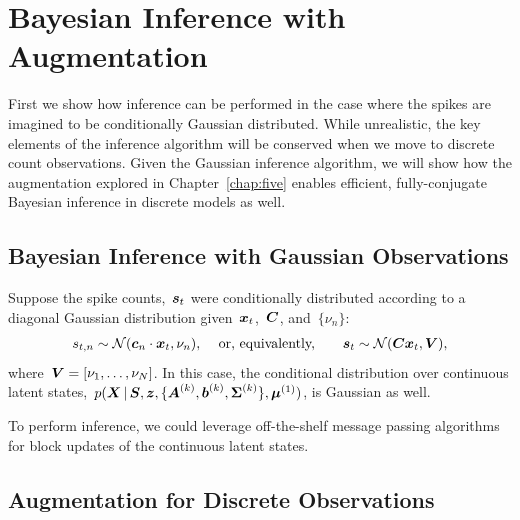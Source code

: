 \section{Bayesian Inference with \polyagamma Augmentation}

First we show how inference can be performed in the case where
the spikes are imagined to be conditionally Gaussian distributed.
While unrealistic, the key elements of the inference algorithm
will be conserved when we move to discrete count observations.
Given the Gaussian inference algorithm, we will show how the \polyagamma
augmentation explored in Chapter~\ref{chap:five} enables efficient,
fully-conjugate Bayesian inference in discrete models as well.


\subsection{Bayesian Inference with Gaussian Observations}
Suppose the spike counts,~$\boldsymbol{s}_t$ were conditionally distributed
according to a diagonal Gaussian distribution given~$\boldsymbol{x}_t$,~$\boldsymbol{C}$,
and~$\{\nu_n\}$:
\begin{align*}
  s_{t,n} \sim \mathcal{N}(\boldsymbol{c}_n \cdot \boldsymbol{x}_t, \nu_n), & & &
  \text{ or, equivalently,} & & & 
  \boldsymbol{s}_t \sim \mathcal{N}(\boldsymbol{C} \boldsymbol{x}_t, \boldsymbol{V}),
\end{align*}
where~${\boldsymbol{V} = \left[ \nu_1, \ldots, \nu_N\right]}$.
In this case, the conditional distribution over continuous latent
states,~$p(\boldsymbol{X} \,|\, \boldsymbol{S}, \boldsymbol{z}, \{\boldsymbol{A}^{(k)}, \boldsymbol{b}^{(k)},
\boldsymbol{\Sigma}^{(k)}\}, \boldsymbol{\mu}^{(1)})$, is Gaussian as well.

To
perform inference, we could leverage off-the-shelf message passing
algorithms for block updates of the continuous latent states.

\subsection{\polyagamma Augmentation for Discrete Observations}


